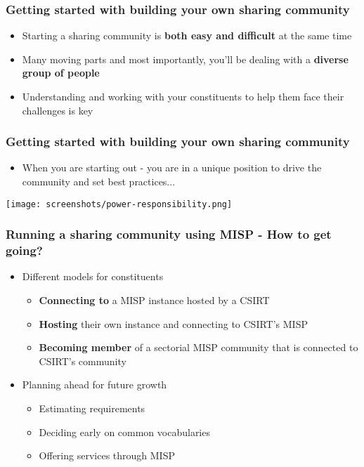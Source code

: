 \begin{frame}
\frametitle{Getting started with building your own sharing community}
\begin{itemize}
	\item Starting a sharing community is {\bf both easy and difficult} at the same time
    \item Many moving parts and most importantly, you'll be dealing with a {\bf diverse group of people}
	\item Understanding and working with your constituents to help them face their challenges is key
\end{itemize}
\end{frame}

\begin{frame}
\frametitle{Getting started with building your own sharing community}
\begin{itemize}
	\item When you are starting out - you are in a unique position to drive the community and set best practices...
\end{itemize}
\texttt{[image: screenshots/power-responsibility.png]}
\end{frame}

\begin{frame}
\frametitle{Running a sharing community using MISP - How to get going?}
\begin{itemize}
	\item Different models for constituents
	\begin{itemize}
        \item {\bf Connecting to} a MISP instance hosted by a CSIRT
        \item {\bf Hosting} their own instance and connecting to CSIRT's MISP
        \item {\bf Becoming member} of a sectorial MISP community that is connected to CSIRT's community
	\end{itemize}
	\item Planning ahead for future growth
	\begin{itemize}
		\item Estimating requirements
		\item Deciding early on common vocabularies
		\item Offering services through MISP
	\end{itemize}
\end{itemize}
\end{frame}

